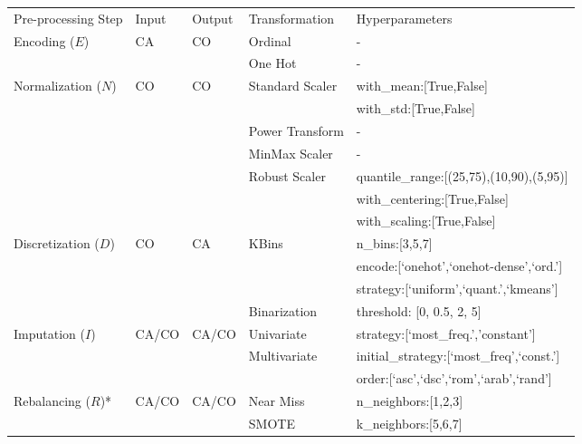 \begin{example}
\begin{table}[!t]
\begin{threeparttable}
\begin{tabular}{@{}p{30mm}lll>{\ttfamily}l@{}}
\toprule
Pre-processing Step& Input & Output & Transformation & \textnormal{Hyperparameters}
\\	\cmidrule[.1em]{1-5}

Encoding ($E$)  & CA & CO & Ordinal & -  \\ \cmidrule[.05em]{4-5} & & & One Hot & - \\
\cmidrule[.1em]{1-5}

Normalization ($N$) & CO & CO & Standard Scaler & with\_mean:[True,False]\\ \cmidrule[.05em]{4-5} & & & & with\_std:[True,False] \\ \cmidrule[.05em]{4-5}
&  &  & Power Transform & -\\ \cmidrule[.05em]{4-5}
&  &  & MinMax Scaler & -\\ \cmidrule[.05em]{4-5}
&  &  & Robust Scaler & quantile\_range:[(25,75),(10,90),(5,95)]\\ \cmidrule[.05em]{4-5} & & & & with\_centering:[True,False]\\ \cmidrule[.05em]{4-5} & & & & with\_scaling:[True,False] \\
\cmidrule[.1em]{1-5}

Discretization ($D$) & CO & CA & KBins & n\_bins:[3,5,7]\\ \cmidrule[.05em]{4-5} & & & & encode:[`onehot',`onehot-dense',`ord.']\\ \cmidrule[.05em]{4-5} & & & & strategy:[`uniform',`quant.',`kmeans']\\	\cmidrule[.05em]{4-5}
&  &  & Binarization  & threshold: [0, 0.5, 2, 5]\\	\cmidrule[.1em]{1-5}

Imputation ($I$) & CA/CO & CA/CO  & Univariate & strategy:[`most\_freq.','constant'] \\	\cmidrule[.05em]{4-5}
 & &  & Multivariate & initial\_strategy:[`most\_freq',`const.']\\ \cmidrule[.05em]{4-5} & & & & order:[`asc',`dsc',`rom',`arab',`rand'] \\	\cmidrule[.1em]{1-5}

Rebalancing ($R$)* &CA/CO  & CA/CO & Near Miss & n\_neighbors:[1,2,3]\\ \cmidrule[.05em]{4-5}
&  &  & SMOTE & k\_neighbors:[5,6,7]\\	\cmidrule[.1em]{1-5}


\end{tabular}
\end{threeparttable}
\end{table}
\end{example}
